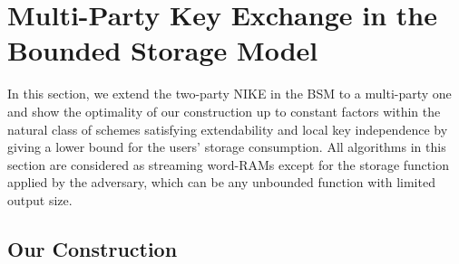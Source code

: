 \section{Multi-Party Key Exchange in the Bounded Storage Model}
\label{sec:bsm-nike}

In this section, we extend the two-party NIKE in the BSM \cite{C:CacMau97} to a multi-party one and show the optimality of our construction up to constant factors within the natural class of schemes satisfying extendability and local key independence by giving a lower bound for the users' storage consumption. All algorithms in this section are considered as streaming word-RAMs except for the storage function applied by the adversary, which can be any unbounded function with limited output size.

\subsection{Our Construction}
%

%
%



